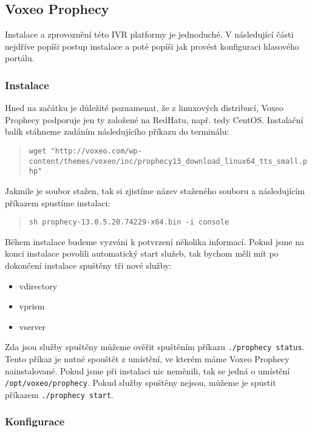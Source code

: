 \documentclass[ing,male,java,dept460]{diploma}						%
\begin{document}
\subsection{Voxeo Prophecy}
\label{sec:voxeo_conf}
Instalace a zprovoznění této IVR platformy je jednoduché. V následující části nejdříve popíši postup instalace a poté popíši jak provést konfiguraci hlasového portálu.

\subsubsection{Instalace}
Hned na začátku je důležité poznamenat, že z linuxových distribucí, Voxeo Prophecy podporuje jen ty založené na RedHatu, např. tedy CentOS. Instalační balík stáhneme zadáním následujícího příkazu do terminálu:

\begin{quote}
\begin{sloppypar}
	\texttt{wget "http://voxeo.com/wp-content/themes/voxeo/inc/prophecy13\allowbreak\_download\_linux64\_tts\_small.php"}
\end{sloppypar}
\end{quote}

Jakmile je soubor stažen, tak si zjistíme název staženého souboru a následujícím příkazem spustíme instalaci:

\begin{quote}
	\texttt{sh prophecy-13.0.5.20.74229-x64.bin -i console}
\end{quote}

Během instalace budeme vyzváni k potvrzení několika informací. Pokud jsme na konci instalace povolili automatický start služeb, tak bychom měli mít po dokončení instalace spuštěny tři nové služby:

\begin{itemize}
\item vdirectory
\item vprism
\item vserver
\end{itemize}

Zda jsou služby spuštěny můžeme ověřit spuštěním příkazu \texttt{./prophecy status}. Tento příkaz je nutné spouštět z umístění, ve kterém máme Voxeo Prophecy nainstalované. Pokud jsme při instalaci nic neměnili, tak se jedná o umístění \texttt{/opt/voxeo/prophecy}. Pokud služby spuštěny nejsou, můžeme je spustit příkazem \texttt{./prophecy start}.

\subsubsection{Konfigurace}
\end{document}
